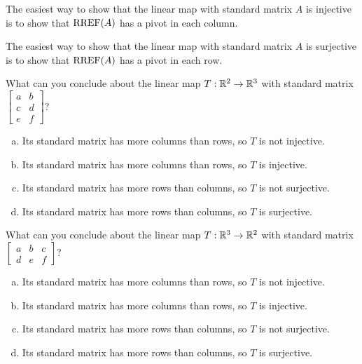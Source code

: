 \begin{observation}
  The easiest way to show that the linear map with standard matrix \(A\)
  is injective is to show that \(\operatorname{RREF}(A)\) has a pivot in each column.

  \vspace{1em}

  The easiest way to show that the linear map with standard matrix \(A\)
  is surjective is to show that \(\operatorname{RREF}(A)\) has a pivot in each row.
\end{observation}

\begin{activity}{3}
  What can you conclude about the linear map 
  \(T:\mathbb{R}^2\to\mathbb{R}^3\) with standard matrix 
  \(\begin{bmatrix} a & b \\ c & d \\ e & f \end{bmatrix}\)?
  \begin{enumerate}[a)]
    \item Its standard matrix has more columns than rows, so \(T\) is not
    injective.
    \item Its standard matrix has more columns than rows, so \(T\) is
    injective.
    \item Its standard matrix has more rows than columns, so \(T\) is not
    surjective.
    \item Its standard matrix has more rows than columns, so \(T\) is
    surjective.
  \end{enumerate}
\end{activity}

\begin{activity}{2}
  What can you conclude about the linear map \(T:\mathbb{R}^3\to\mathbb{R}^2\) with standard matrix 
  \(\begin{bmatrix} a & b & c \\ d & e & f \end{bmatrix}\)?
  \begin{enumerate}[a)]
    \item Its standard matrix has more columns than rows, so \(T\) is not
    injective.
    \item Its standard matrix has more columns than rows, so \(T\) is
    injective.
    \item Its standard matrix has more rows than columns, so \(T\) is not
    surjective.
    \item Its standard matrix has more rows than columns, so \(T\) is
    surjective.
  \end{enumerate}
\end{activity}

